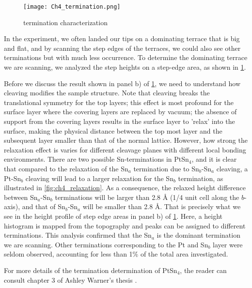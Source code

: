 \begin{figure}
	\centering
	\texttt{[image: Ch4\_termination.png]}
	\caption{termination characterization}
	\label{fig:ch4_termination}
\end{figure}

\par In the experiment, we often landed our tips on a dominating terrace that is big and flat, and by scanning the step edges of the terraces, we could also see other terminations but with much less occurrence. To determine the dominating terrace we are scanning, we analyzed the step heights on a step-edge area, as shown in \ref{fig:ch4_termination}. 

Before we discuss the result shown in panel b) of \ref{fig:ch4_termination}, we need to understand how cleaving modifies the sample structure. Note that cleaving breaks the translational symmetry for the top layers; this effect is most profound for the surface layer where the covering layers are replaced by vacuum; the absence of support from the covering layers results in the surface layer to 'relax' into the surface, making the physical distance between the top most layer and the subsequent layer smaller than that of the normal lattice. However, how strong the relaxation effect is varies for different cleavage planes with different local bonding environments. There are two possible Sn-terminations in PtSn$_4$, and it is clear that compared to the relaxation of the Sn$_a$ termination due to Sn$_b$-Sn$_a$ cleaving, a Pt-Sn$_b$ cleaving will lead to a larger relaxation for the Sn$_b$ termination, as illustrated in \ref{fig:ch4_relaxation}. As a consequence, the relaxed height difference between Sn$_a$-Sn$_b$ terminations will be larger than 2.8 {\AA} (1/4 unit cell along the $b$-axis), and that of Sn$_b$-Sn$_a$ will be smaller than 2.8 {\AA}. That is precisely what we see in the height profile of step edge areas in panel b) of \ref{fig:ch4_termination}. Here, a height histogram is mapped from the topography and peaks can be assigned to different terminations. This analysis confirmed that the Sn$_a$ is the dominant termination we are scanning. Other terminations corresponding to the Pt and Sn$_b$ layer were seldom observed, accounting for less than 1\% of the total area investigated. 

\par For more details of the termination determination of PtSn$_4$, the reader can consult chapter 3 of Ashley Warner's thesis \cite{warnerDefectTerraceCharacterization2022}.

